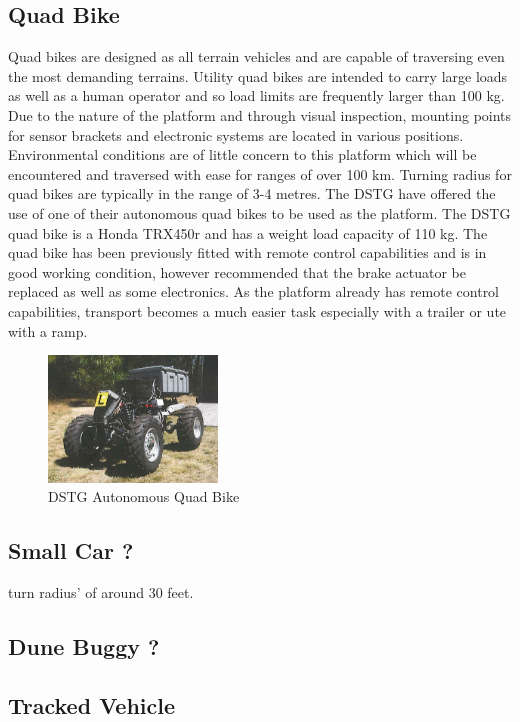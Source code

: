 \documentclass[main.tex]{subfiles}
\begin{document}
\subsection{Quad Bike}
Quad bikes are designed as all terrain vehicles and are capable of traversing even the most demanding terrains. Utility quad bikes are intended to carry large loads as well as a human operator and so load limits are frequently larger than 100 kg. Due to the nature of the platform and through visual inspection, mounting points for sensor brackets and electronic systems are located in various positions.  Environmental conditions are of little concern to this platform which will be encountered and traversed with ease for ranges of over 100 km. Turning radius for quad bikes are typically in the range of 3-4 metres.
The DSTG have offered the use of one of their autonomous quad bikes to be used as the platform. The DSTG quad bike is a Honda TRX450r and has a weight load capacity of 110 kg. The quad bike has been previously fitted with remote control capabilities and is in good working condition, however \textcite{scheiner2011} recommended that the brake actuator be replaced as well as some electronics. As the platform already has remote control capabilities, transport becomes a much easier task especially with a trailer or ute with a ramp.
\begin{figure}[ht]
\includegraphics[width=0.4\textwidth]{4-ConceptDesign/2011quadbike.PNG}
\centering
\caption[DSTG Autonomous Quad Bike]{DSTG Autonomous Quad Bike \parencite{scheiner2011}} 
\end{figure}

\subsection{Small Car ?}
turn radius' of around 30 feet.

\subsection{Dune Buggy ?}

\subsection{Tracked Vehicle}
\end{document}
